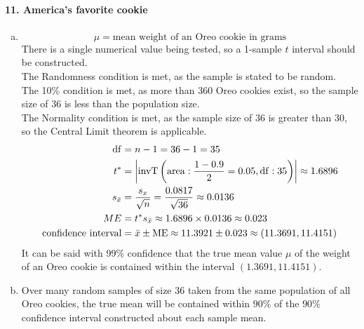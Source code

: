 \documentclass[../Homework]{subfiles}
\begin{document}
		\paragraph{11. America's favorite cookie}
			\begin{enumerate}[a.]
				\item
					\[\mu = \text{mean weight of an Oreo cookie in grams}\]
					There is a single numerical value being tested, so a 1-sample $t$ interval should be constructed. \\
					The Randomness condition is met, as the sample is stated to be random. \\
					The 10\% condition is met, as more than 360 Oreo cookies exist, so the sample size of 36 is less than the population size. \\
					The Normality condition is met, as the sample size of 36 is greater than 30, so the Central Limit theorem is applicable.
					\begin{align*}
						\operatorname{df} &= n - 1 = 36 - 1 = 35 \\
						t^* &= \left|\operatorname{invT}\left(\operatorname{area}: \frac{1 - 0.9}{2} = 0.05, \operatorname{df}: 35\right) \right| \approx 1.6896 \\
						s_{\bar{x}} &= \frac{s_x}{\sqrt{n}} = \frac{0.0817}{\sqrt{36}} \approx 0.0136 \\
						ME &= t^*s_{\bar{x}} \approx 1.6896 \times 0.0136 \approx 0.023 \\
						\text{confidence interval} &= \bar{x} \pm \operatorname{ME} \approx 11.3921 \pm 0.023 \approx (11.3691, 11.4151)
					\end{align*}
					It can be said with 99\% confidence that the true mean value $\mu$ of the weight of an Oreo cookie is contained within the interval $(1.3691, 11.4151)$.
				\item
					Over many random samples of size 36 taken from the same population of all Oreo cookies, the true mean will be contained within $90\%$ of the $90\%$ confidence interval constructed about each sample mean.
			\end{enumerate}
\end{document}

